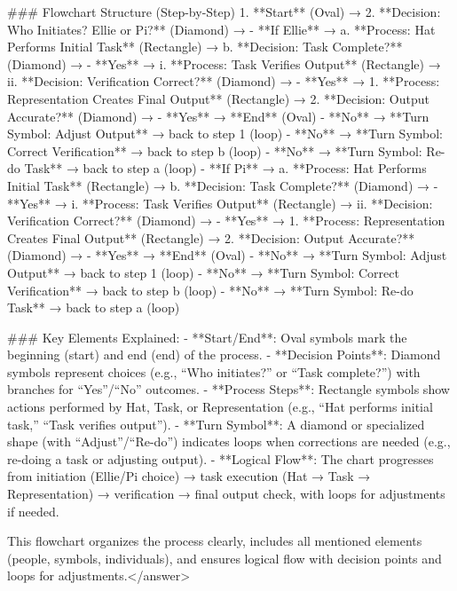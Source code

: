 ### Flowchart Structure (Step-by-Step)  
1. **Start** (Oval) →  
2. **Decision: Who Initiates? Ellie or Pi?** (Diamond) →  
   - **If Ellie** →  
     a. **Process: Hat Performs Initial Task** (Rectangle) →  
     b. **Decision: Task Complete?** (Diamond) →  
        - **Yes** →  
          i. **Process: Task Verifies Output** (Rectangle) →  
          ii. **Decision: Verification Correct?** (Diamond) →  
             - **Yes** →  
               1. **Process: Representation Creates Final Output** (Rectangle) →  
               2. **Decision: Output Accurate?** (Diamond) →  
                  - **Yes** → **End** (Oval)  
                  - **No** → **Turn Symbol: Adjust Output** → back to step 1 (loop)  
             - **No** → **Turn Symbol: Correct Verification** → back to step b (loop)  
        - **No** → **Turn Symbol: Re-do Task** → back to step a (loop)  
   - **If Pi** →  
     a. **Process: Hat Performs Initial Task** (Rectangle) →  
     b. **Decision: Task Complete?** (Diamond) →  
        - **Yes** →  
          i. **Process: Task Verifies Output** (Rectangle) →  
          ii. **Decision: Verification Correct?** (Diamond) →  
             - **Yes** →  
               1. **Process: Representation Creates Final Output** (Rectangle) →  
               2. **Decision: Output Accurate?** (Diamond) →  
                  - **Yes** → **End** (Oval)  
                  - **No** → **Turn Symbol: Adjust Output** → back to step 1 (loop)  
             - **No** → **Turn Symbol: Correct Verification** → back to step b (loop)  
        - **No** → **Turn Symbol: Re-do Task** → back to step a (loop)  


### Key Elements Explained:  
- **Start/End**: Oval symbols mark the beginning (start) and end (end) of the process.  
- **Decision Points**: Diamond symbols represent choices (e.g., “Who initiates?” or “Task complete?”) with branches for “Yes”/“No” outcomes.  
- **Process Steps**: Rectangle symbols show actions performed by Hat, Task, or Representation (e.g., “Hat performs initial task,” “Task verifies output”).  
- **Turn Symbol**: A diamond or specialized shape (with “Adjust”/“Re-do”) indicates loops when corrections are needed (e.g., re-doing a task or adjusting output).  
- **Logical Flow**: The chart progresses from initiation (Ellie/Pi choice) → task execution (Hat → Task → Representation) → verification → final output check, with loops for adjustments if needed.  


This flowchart organizes the process clearly, includes all mentioned elements (people, symbols, individuals), and ensures logical flow with decision points and loops for adjustments.</answer>